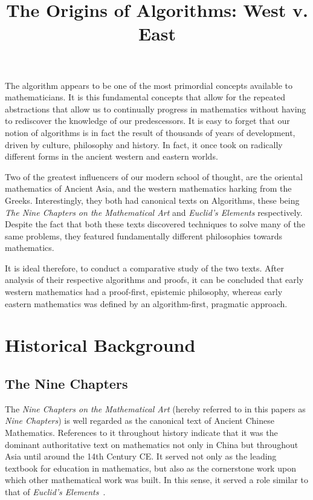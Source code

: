 \documentclass[12pt]{article}
\title{The Origins of Algorithms: West v. East}
\date{}
\author{}
\begin{document}
\maketitle{}
The algorithm appears to be one of the most primordial concepts available
to mathematicians. It is this fundamental concepts that allow for the
repeated abstractions that allow us to continually progress in mathematics
without having to rediscover the knowledge of our predescessors. It is easy to
forget that our notion of algorithms is in fact the result of thousands of years 
of development, driven by culture, philosophy and history. In fact, it once took on
radically different forms in the ancient western and eastern worlds.

Two of the greatest influencers of our modern school of thought, are the 
oriental mathematics of Ancient Asia, and the western mathematics harking
from the Greeks. Interestingly, they both had canonical texts on Algorithms,
these being \emph{The Nine Chapters on the Mathematical Art} and \emph{Euclid's Elements} 
respectively. Despite the fact that both these texts discovered techniques to 
solve many of the same problems, they featured fundamentally different philosophies towards mathematics.

It is ideal therefore, to conduct a comparative study of the two texts. After analysis of their
respective algorithms and proofs, it can be concluded that early western mathematics
had a proof-first, epistemic philosophy, whereas early eastern mathematics was defined by an algorithm-first,
pragmatic approach.

\section{Historical Background}
\subsection{The Nine Chapters}
The \emph{Nine Chapters on the Mathematical Art} 
 (hereby referred to in this papers as \emph{Nine Chapters})
is well regarded as the canonical text of Ancient
Chinese Mathematics. References to it throughout
history indicate that it was the dominant
authoritative text on mathematics not only in China
but throughout Asia until around the 14th Century
CE. It served not only as the leading textbook for
education in mathematics, but also as the
cornerstone work upon which other mathematical
work was built. In this sense, it served a role
similar to that of \emph{Euclid’s Elements}~\cite{Boyer}.
\end{document}
